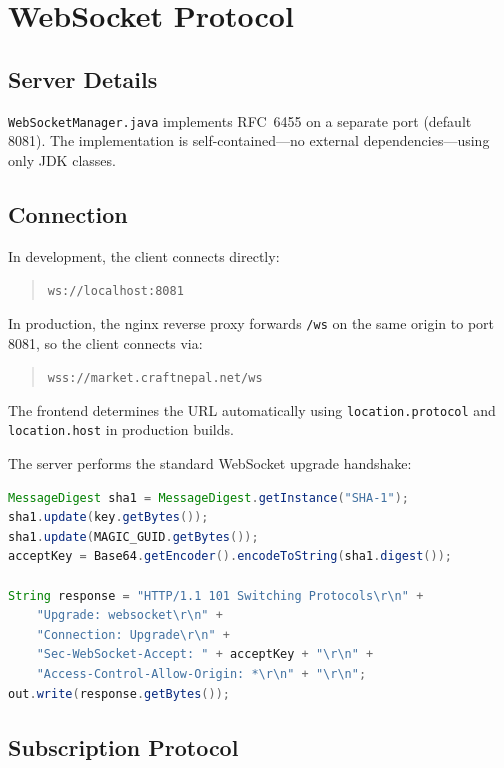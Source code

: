 \documentclass[12pt,a4paper]{report}
\begin{document}
\chapter{WebSocket Protocol}

\section{Server Details}

\texttt{WebSocketManager.java} implements RFC~6455 on a separate port
(default 8081). The implementation is self-contained---no external
dependencies---using only JDK classes.

\section{Connection}

In development, the client connects directly:
\begin{quote}
\texttt{ws://localhost:8081}
\end{quote}

In production, the nginx reverse proxy forwards \texttt{/ws} on the same
origin to port 8081, so the client connects via:
\begin{quote}
\texttt{wss://market.craftnepal.net/ws}
\end{quote}

The frontend determines the URL automatically using
\texttt{location.protocol} and \texttt{location.host} in production builds.

The server performs the standard WebSocket upgrade handshake:

\begin{lstlisting}[language=Java, caption=WebSocket handshake (WebSocketManager.java)]
MessageDigest sha1 = MessageDigest.getInstance("SHA-1");
sha1.update(key.getBytes());
sha1.update(MAGIC_GUID.getBytes());
acceptKey = Base64.getEncoder().encodeToString(sha1.digest());

String response = "HTTP/1.1 101 Switching Protocols\r\n" +
    "Upgrade: websocket\r\n" +
    "Connection: Upgrade\r\n" +
    "Sec-WebSocket-Accept: " + acceptKey + "\r\n" +
    "Access-Control-Allow-Origin: *\r\n" + "\r\n";
out.write(response.getBytes());
\end{lstlisting}

\section{Subscription Protocol}
\end{document}
